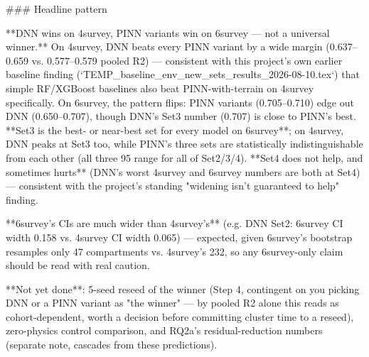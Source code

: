 ### Headline pattern

**DNN wins on 4survey, PINN variants win on 6survey — not a universal winner.** On 4survey, DNN
beats every PINN variant by a wide margin (0.637–0.659 vs. 0.577–0.579 pooled R2) — consistent
with this project's own earlier baseline finding (`TEMP_baseline_env_new_sets_results_2026-08-10.tex`)
that simple RF/XGBoost baselines also beat PINN-with-terrain on 4survey specifically. On 6survey,
the pattern flips: PINN variants (0.705–0.710) edge out DNN (0.650–0.707), though DNN's Set3
number (0.707) is close to PINN's best. **Set3 is the best- or near-best set for every model on
6survey**; on 4survey, DNN peaks at Set3 too, while PINN's three sets are statistically
indistinguishable from each other (all three 95%
range for all of Set2/3/4). **Set4 does not help, and sometimes hurts** (DNN's worst 4survey and
6survey numbers are both at Set4) — consistent with the project's standing "widening isn't
guaranteed to help" finding.

**6survey's CIs are much wider than 4survey's** (e.g. DNN Set2: 6survey CI width 0.158 vs.
4survey CI width 0.065) — expected, given 6survey's bootstrap resamples only 47 compartments vs.
4survey's 232, so any 6survey-only claim should be read with real caution.

**Not yet done**: 5-seed reseed of the winner (Step 4, contingent on you picking DNN or a PINN
variant as "the winner" — by pooled R2 alone this reads as cohort-dependent, worth a decision
before committing cluster time to a reseed), zero-physics control comparison, and RQ2a's
residual-reduction numbers (separate note, cascades from these predictions).
